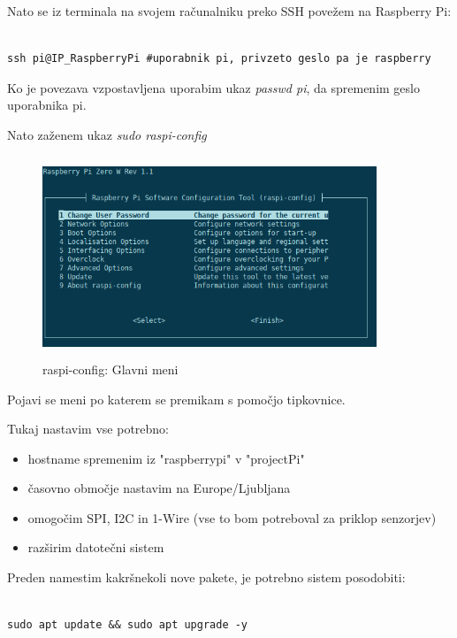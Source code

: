 \documentclass[11pt]{article}
\newcommand{\source}[2]{\caption{#1}\vspace{-1.5mm}{\tiny{\url{{#2}}}} }
\begin{document}
Nato se iz terminala na svojem računalniku preko SSH povežem na Raspberry Pi:

\begin{verbatim}
  
ssh pi@IP_RaspberryPi #uporabnik pi, privzeto geslo pa je raspberry
\end{verbatim}

Ko je povezava vzpostavljena uporabim ukaz \textit{passwd pi}, da spremenim geslo uporabnika pi.

Nato zaženem ukaz \textit{sudo raspi-config}
\begin{figure}[h]
\centering
\includegraphics[width=10cm, height=6cm]{images/raspi-config.png}
\source{raspi-config: Glavni meni}{}
\end{figure}

Pojavi se meni po katerem se premikam s pomočjo tipkovnice.

Tukaj nastavim vse potrebno:
\begin{itemize}
    \item hostname spremenim iz "raspberrypi" v "projectPi"
    \item časovno območje nastavim na Europe/Ljubljana
    \item omogočim SPI, I2C in 1-Wire (vse to bom potreboval za priklop senzorjev)
    \item razširim datotečni sistem
\end{itemize}

Preden namestim kakršnekoli nove pakete, je potrebno sistem posodobiti:

\begin{verbatim}
  
sudo apt update && sudo apt upgrade -y
\end{verbatim}
\end{document}
